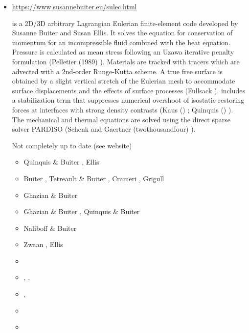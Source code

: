 \begin{itemize}
\item \sulec {}

\url{https://www.susannebuiter.eu/sulec.html}

\sulec is a 2D/3D arbitrary Lagrangian Eulerian finite-element 
code developed by Susanne Buiter and Susan Ellis. 
It solves the equation for conservation of momentum for an incompressible fluid combined with 
the heat equation. Pressure is calculated as mean stress following an Uzawa iterative penalty 
formulation (Pelletier \etal (1989) \cite{pefc89}). 
Materials are tracked with tracers which are advected with a 2nd-order Runge-Kutta scheme. 
A true free surface is obtained by a slight vertical stretch of the Eulerian mesh to 
accommodate surface displacements and the effects of surface processes (Fullsack \nineteenninetyfive \cite{full95}). 
\sulec includes a stabilization term that suppresses numerical overshoot of isostatic restoring forces 
at interfaces with strong density contrasts (Kaus \etal (\twothousandten) \cite{kamm10}; 
Quinquis \etal (\twothousandeleven) \cite{qube11}). The mechanical and thermal equations are solved using 
the direct sparse solver PARDISO (Schenk and Gaertner (twothousandfour) \cite{scga04}).

Not completely up to date (see website)
\begin{scriptsize}
\begin{itemize}
\item[\twothousandeleven] Quinquis \& Buiter \cite{qube11}, Ellis \etal \cite{ellw11}
\item[\twothousandtwelve] Buiter \cite{buit12}, Tetreault \& Buiter \cite{tebu12},
                          Crameri \etal \cite{crsg12}, Grigull \etal \cite{grel12}
\item[\twothousandthirteen] Ghazian \& Buiter \cite{ghbu13}
\item[\twothousandfourteen] Ghazian \& Buiter \cite{ghbu14}, Quinquis \& Buiter \cite{qubu14}
\item[\twothousandfifteen] Naliboff \& Buiter \cite{nabu15}
\item[\twothousandsixteen] Zwaan \etal \cite{zwsn16}, Ellis \etal \cite{elwr16}
\item[\twothousandseventeen] \textcite{nabp17}
\item[\twothousandeighteen]  \textcite{tebu18},  \textcite{fade18},  \textcite{weef18}
\item[\twothousandnineteen]  \textcite{elgb19},  \textcite{biem19}
\item[\twothousandtwenty]    \textcite{pena20}
\item[\twothousandtwenty]    \textcite{pefb22} 
\end{itemize}
\end{scriptsize}



\end{itemize}
